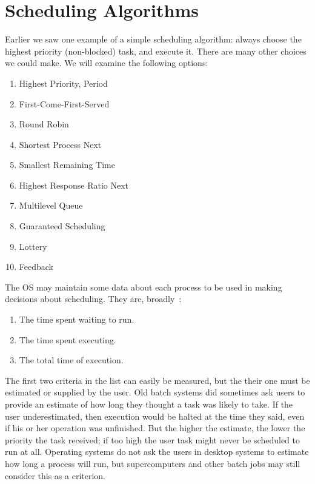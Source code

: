 




\section*{Scheduling Algorithms}

Earlier we saw one example of a simple scheduling algorithm: always choose the highest priority (non-blocked) task, and execute it. There are many other choices we could make. We will examine the following options:
\begin{enumerate}
	\item Highest Priority, Period
	\item First-Come-First-Served
	\item Round Robin
	\item Shortest Process Next
	\item Smallest Remaining Time
	\item Highest Response Ratio Next
	\item Multilevel Queue
	\item Guaranteed Scheduling
	\item Lottery
	\item Feedback
\end{enumerate}

The OS may maintain some data about each process to be used in making decisions about scheduling. They are, broadly~\cite{osi}:

\begin{enumerate}
	\item The time spent waiting to run.
	\item The time spent executing.
	\item The total time of execution.
\end{enumerate}

The first two criteria in the list can easily be measured, but the their one must be estimated or supplied by the user. Old batch systems did sometimes ask users to provide an estimate of how long they thought a task was likely to take. If the user underestimated, then execution would be halted at the time they said, even if his or her operation was unfinished. But the higher the estimate, the lower the priority the task received; if too high the user task might never be scheduled to run at all. Operating systems do not ask the users in desktop systems to estimate how long a process will run, but supercomputers and other batch jobs may still consider this as a criterion.

